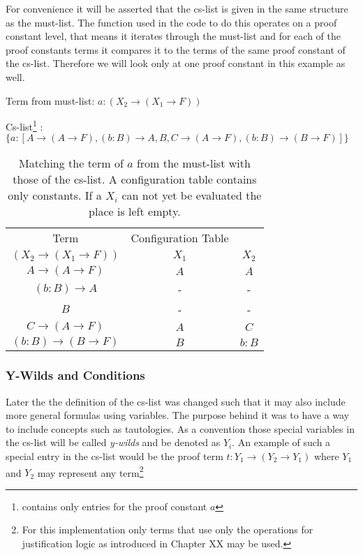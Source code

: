 For convenience it will be asserted that the cs-list is given in the same structure as the must-list. The function used in the code to do this operates on a proof constant level, that means it iterates through the must-list and for each of the proof constants terms it compares it to the terms of the same proof constant of the cs-list. Therefore we will look only at one proof constant in this example as well.

\vspace{0.2cm}

Term from must-list: $a:(X_2\rightarrow (X_1 \rightarrow F))$

Cs-list\footnote{contains only entries for the proof constant $a$} : $\{a: [A \rightarrow (A \rightarrow F), (b:B) \rightarrow A, B, C \rightarrow (A \rightarrow F), (b:B) \rightarrow (B \rightarrow F)]\}$

\vspace{0.2cm}
\begin{table}[ht]
\centering
\begin{tabular}{ c || c c }
	Term									&	Configuration Table \\
	$(X_2\rightarrow (X_1 \rightarrow F))$	& $X_1$ & $X_2$ \\
	\hline
	$A \rightarrow (A \rightarrow F)$ 		& $A$ & $A$ \\
	$(b:B) \rightarrow A$ 					& - & - \\
	$B$ 									& - & - \\
	$C \rightarrow (A \rightarrow F)$ 		& $A$ & $C$\\
	$(b:B) \rightarrow (B \rightarrow F)$ 	& $B$ & $b:B$\\
\end{tabular}
\caption{Matching the term of $a$ from the must-list with those of the cs-list. A configuration table contains only constants. If a $X_i$ can not yet be evaluated the place is left empty.}
\end{table}


\subsubsection{Y-Wilds and Conditions}
Later the the definition of the cs-list was changed such that it may also include more general formulas using variables. The purpose behind it was to have a way to include concepts such as tautologies. As a convention those special variables in the cs-list will be called \emph{y-wilds} and be denoted as $Y_i$. An example of such a special entry in the cs-list would be the proof term $t:Y_1 \rightarrow (Y_2 \rightarrow Y_1)$ where $Y_1$ and $Y_2$ may represent any term\footnote{For this implementation only terms that use only the operations for justification logic as introduced in Chapter XX may be used.}

